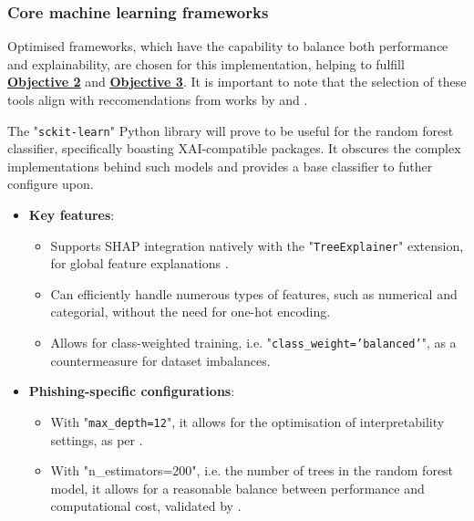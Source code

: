 
\subsubsection*{Core machine learning frameworks}
Optimised frameworks, which have the capability to balance both performance and explainability, are chosen for this implementation, helping to fulfill \hyperref[objective-2]{\uline{\textbf{Objective 2}}} and \hyperref[objective-3]{\uline{\textbf{Objective 3}}}. It is important to note that the selection of these tools align with reccomendations from works by \cite{shirazi2022towards} and \cite{gupta2021novel}.\newline

\noindent The "\texttt{sckit-learn}" Python library will prove to be useful for the random forest classifier, specifically boasting XAI-compatible packages. It obscures the complex implementations behind such models and provides a base classifier to futher configure upon.

\begin{itemize}
  \item \textbf{Key features}:
  \begin{itemize}
    \item Supports SHAP integration natively with the "\texttt{TreeExplainer}" extension, for global feature explanations \citep{lundberg2017unified}.
    \item Can efficiently handle numerous types of features, such as numerical and categorial, without the need for one-hot encoding.
    \item Allows for class-weighted training, i.e. "\texttt{class\_weight='balanced'}", as a countermeasure for dataset imbalances.
  \end{itemize}
  \item \textbf{Phishing-specific configurations}:
  \begin{itemize}
    \item With "\texttt{max\_depth=12}", it allows for the optimisation of interpretability settings, as per \citep{greco2023explaining}.
    \item With "n\_estimators=200", i.e. the number of trees in the random forest model, it allows for a reasonable balance between performance and computational cost, validated by \cite{kapoor2024comparative}.
  \end{itemize}
\end{itemize}

